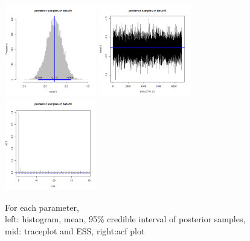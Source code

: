 \documentclass{article}
\begin{document}
\begin{figure}[!h]
    \includegraphics[width=4cm]{beta10_hist.png}
    \includegraphics[width=4cm]{beta10_traceplot.png}
    \includegraphics[width=4cm]{beta10_acf.png}
    \caption{For each parameter, \\left: histogram, mean, 95\% credible interval of posterior samples, mid: traceplot and ESS, right:acf plot}
\end{figure}
\end{document}
